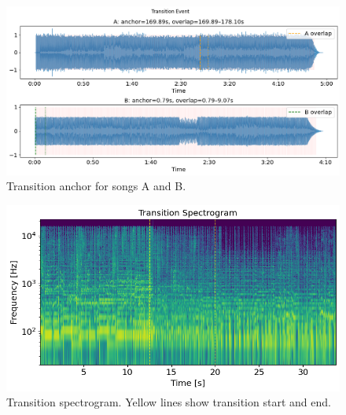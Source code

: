 \documentclass{article}
\begin{document}
\begin{figure}[H]
    \centering
    \includegraphics[width=\textwidth]{figures/transition.png}
    \caption{Transition anchor for songs A and B.}
\end{figure}

\begin{figure}[H]
    \centering
    \includegraphics[width=\textwidth]{figures/spectogram.png}
    \caption{Transition spectrogram. Yellow lines show transition start and end.}
\end{figure}
\end{document}
